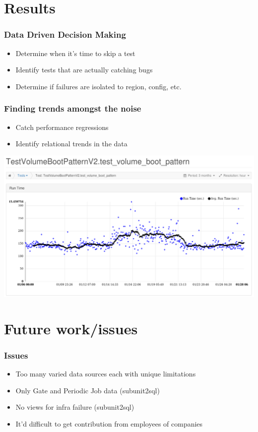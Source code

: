 \documentclass[aspectratio=43,11pt,hyperref={colorlinks=true}]{beamer}
\begin{document}
\section{Results}
\begin{frame}
    \frametitle{Data Driven Decision Making}
    \begin{itemize}
        \item Determine when it's time to skip a test
        \item Identify tests that are actually catching bugs
        \item Determine if failures are isolated to region, config, etc.
    \end{itemize}
\end{frame}

\begin{frame}
    \frametitle{Finding trends amongst the noise}
    \begin{itemize}
        \item Catch performance regressions
        \item Identify relational trends in the data
    \end{itemize}
    \begin{center}
        \includegraphics[height=.7\textheight]{Performance-Issue-o-h.png}
    \end{center}
\end{frame}

\section{Future work/issues}

\begin{frame}
    \frametitle{Issues}
    \begin{itemize}
        \item Too many varied data sources each with unique limitations
        \item Only Gate and Periodic Job data (subunit2sql)
        \item No views for infra failure (subunit2sql)
        \item It'd difficult to get contribution from employees of companies
    \end{itemize}
\end{frame}
\end{document}
